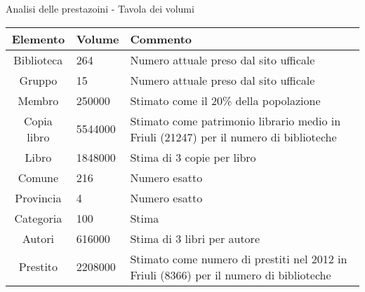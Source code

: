 \begin{frame}{Analisi delle prestazoini - Tavola dei volumi}
    \scriptsize
    \def\arraystretch{1.5}
    \begin{center}
        \begin{tabular}{|c|m{2.7cm}|m{5.5cm}|}
            \hline
            \textbf{Elemento}   & \textbf{Volume} & \textbf{Commento} \\ \hline
            Biblioteca          & 264 & Numero attuale preso dal sito ufficale \\ \hline
            Gruppo              & 15 & Numero attuale preso dal sito ufficale \\ \hline
            Membro              & 250000 & Stimato come il 20\% della popolazione \\ \hline
            Copia libro         & 5544000 & Stimato come patrimonio librario medio in Friuli (21247) per il numero di biblioteche \\ \hline
            Libro               & 1848000 & Stima di 3 copie per libro \\ \hline
            Comune              & 216 & Numero esatto \\ \hline
            Provincia           & 4 & Numero esatto \\ \hline
            Categoria           & 100 & Stima \\ \hline
            Autori              & 616000 & Stima di 3 libri per autore \\ \hline
            Prestito            & 2208000 & Stimato come numero di prestiti nel 2012 in Friuli (8366) per il numero di biblioteche \\ \hline
        \end{tabular}
    \end{center}
\end{frame}

